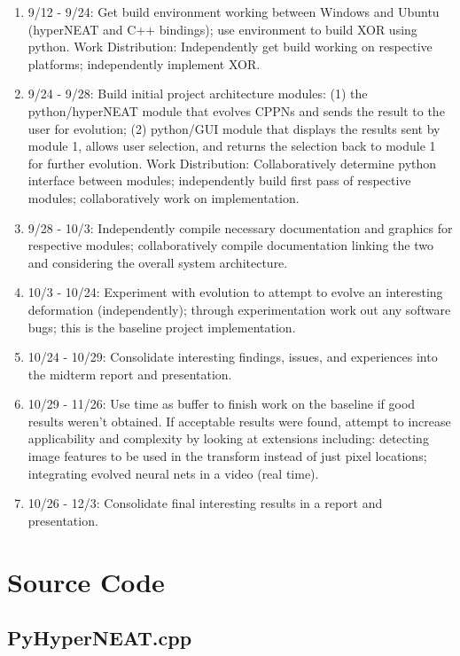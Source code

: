 \documentclass[a4paper,10pt]{article}
\begin{document}
\begin{enumerate}
    \item 9/12 - 9/24: Get build environment working between Windows and Ubuntu (hyperNEAT and C++ bindings); use environment to build XOR using python.
Work Distribution: Independently get build working on respective platforms; independently implement XOR.
    \item 9/24 - 9/28: Build initial project architecture modules: (1) the python/hyperNEAT module that evolves CPPNs and sends the result to the user for evolution; (2) python/GUI module that displays the results sent by module 1, allows user selection, and returns the selection back to module 1 for further evolution.
Work Distribution: Collaboratively determine python interface between modules; independently build first pass of respective modules; collaboratively work on implementation.
    \item 9/28 - 10/3: Independently compile necessary documentation and graphics for respective modules; collaboratively compile documentation linking the two and considering the overall system architecture.
    \item 10/3 - 10/24: Experiment with evolution to attempt to evolve an interesting deformation (independently); through experimentation work out any software bugs; this is the baseline project implementation.
    \item 10/24 - 10/29: Consolidate interesting findings, issues, and experiences into the midterm report and presentation.
    \item 10/29 - 11/26: Use time as buffer to finish work on the baseline if good results weren’t obtained. If acceptable results were found, attempt to increase applicability and complexity by looking at extensions including: detecting image features to be used in the transform instead of just pixel locations; integrating evolved neural nets in a video (real time).
    \item 10/26 - 12/3: Consolidate final interesting results in a report and presentation.
\end{enumerate}

\section{Source Code}
\label{sec:source}

\subsection{PyHyperNEAT.cpp}

\end{document}
